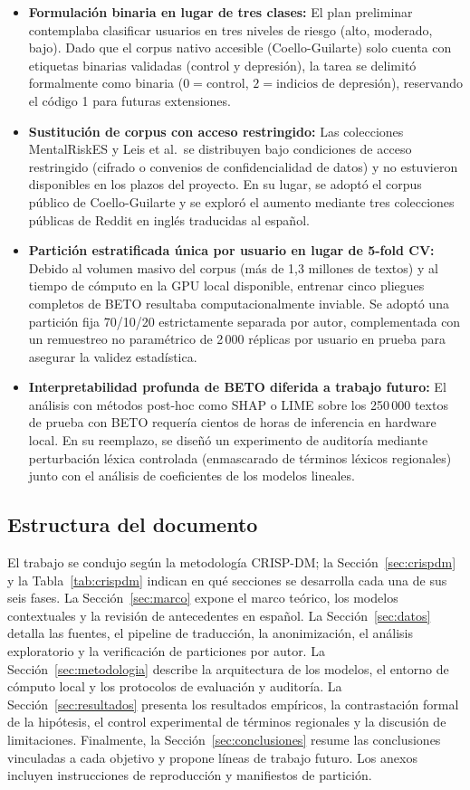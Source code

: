 \documentclass[12pt,a4paper]{article}
\begin{document}
\begin{itemize}[leftmargin=2em]
    \item \textbf{Formulación binaria en lugar de tres clases:} El plan preliminar contemplaba clasificar usuarios en tres niveles de riesgo (alto, moderado, bajo). Dado que el corpus nativo accesible (Coello-Guilarte) solo cuenta con etiquetas binarias validadas (control y depresión), la tarea se delimitó formalmente como binaria ($0 = \text{control}$, $2 = \text{indicios de depresión}$), reservando el código 1 para futuras extensiones.
    \item \textbf{Sustitución de corpus con acceso restringido:} Las colecciones MentalRiskES y Leis et al.\ se distribuyen bajo condiciones de acceso restringido (cifrado o convenios de confidencialidad de datos) y no estuvieron disponibles en los plazos del proyecto. En su lugar, se adoptó el corpus público de Coello-Guilarte y se exploró el aumento mediante tres colecciones públicas de Reddit en inglés traducidas al español.
    \item \textbf{Partición estratificada única por usuario en lugar de 5-fold CV:} Debido al volumen masivo del corpus (más de 1,3 millones de textos) y al tiempo de cómputo en la GPU local disponible, entrenar cinco pliegues completos de BETO resultaba computacionalmente inviable. Se adoptó una partición fija 70/10/20 estrictamente separada por autor, complementada con un remuestreo no paramétrico de 2\,000 réplicas por usuario en prueba para asegurar la validez estadística.
    \item \textbf{Interpretabilidad profunda de BETO diferida a trabajo futuro:} El análisis con métodos post-hoc como SHAP o LIME sobre los 250\,000 textos de prueba con BETO requería cientos de horas de inferencia en hardware local. En su reemplazo, se diseñó un experimento de auditoría mediante perturbación léxica controlada (enmascarado de términos léxicos regionales) junto con el análisis de coeficientes de los modelos lineales.
\end{itemize}

\subsection{Estructura del documento}
El trabajo se condujo según la metodología CRISP-DM; la Sección~\ref{sec:crispdm} y la Tabla~\ref{tab:crispdm} indican en qué secciones se desarrolla cada una de sus seis fases. La Sección~\ref{sec:marco} expone el marco teórico, los modelos contextuales y la revisión de antecedentes en español. La Sección~\ref{sec:datos} detalla las fuentes, el pipeline de traducción, la anonimización, el análisis exploratorio y la verificación de particiones por autor. La Sección~\ref{sec:metodologia} describe la arquitectura de los modelos, el entorno de cómputo local y los protocolos de evaluación y auditoría. La Sección~\ref{sec:resultados} presenta los resultados empíricos, la contrastación formal de la hipótesis, el control experimental de términos regionales y la discusión de limitaciones. Finalmente, la Sección~\ref{sec:conclusiones} resume las conclusiones vinculadas a cada objetivo y propone líneas de trabajo futuro. Los anexos incluyen instrucciones de reproducción y manifiestos de partición.
\end{document}
